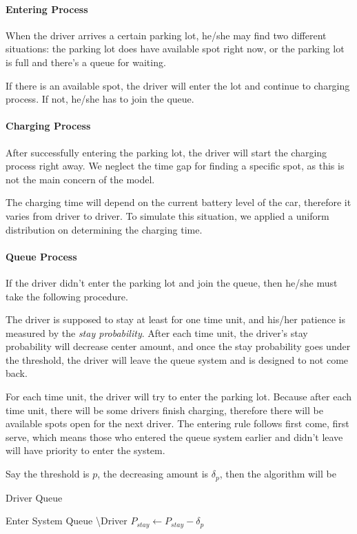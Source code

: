 \paragraph{Entering Process}
When the driver arrives a certain parking lot, he/she may find two different situations: the parking lot does have available spot right now, or the parking lot is full and there's a queue for waiting. 

If there is an available spot, the driver will enter the lot and continue to charging process. If not, he/she has to join the queue. 

\paragraph{Charging Process}
After successfully entering the parking lot, the driver will start the charging process right away. We neglect the time gap for finding a specific spot, as this is not the main concern of the model. 

The charging time will depend on the current battery level of the car, therefore it varies from driver to driver. To simulate this situation, we applied a uniform distribution on determining the charging time. 

\paragraph{Queue Process}
If the driver didn't enter the parking lot and join the queue, then he/she must take the following procedure. 

The driver is supposed to stay at least for one time unit, and his/her patience is measured by the \emph{stay probability}. After each time unit, the driver's stay probability will decrease center amount, and once the stay probability goes under the threshold, the driver will leave the queue system and is designed to not come back. 

For each time unit, the driver will try to enter the parking lot. Because after each time unit, there will be some drivers finish charging, therefore there will be available spots open for the next driver. The entering rule follows first come, first serve, which means those who entered the queue system earlier and didn't leave will have priority to enter the system. 

Say the threshold is $p$, the decreasing amount is $\delta_p$, then the algorithm will be 

\begin{algorithm}
\caption{Driver Queue}
\label{alg:entry}
\begin{algorithmic}[1]
\State Enter System
\State Queue \textbackslash Driver
\Else
\State $P_{stay} \gets P_{stay} - \delta_p$
\EndIf
\EndIf
\end{algorithmic}
\end{algorithm}

